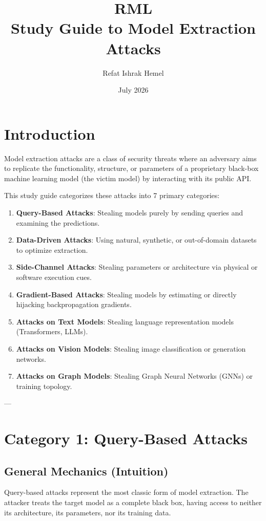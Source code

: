 \documentclass{article}
\title{RML\\
\large Study Guide to Model Extraction Attacks}
\author{Refat Ishrak Hemel}
\date{July 2026}
\begin{document}
\maketitle

\section{Introduction}
Model extraction attacks are a class of security threats where an adversary aims to replicate the functionality, structure, or parameters of a proprietary black-box machine learning model (the victim model) by interacting with its public API. 

This study guide categorizes these attacks into 7 primary categories:
\begin{enumerate}
    \item \textbf{Query-Based Attacks}: Stealing models purely by sending queries and examining the predictions.
    \item \textbf{Data-Driven Attacks}: Using natural, synthetic, or out-of-domain datasets to optimize extraction.
    \item \textbf{Side-Channel Attacks}: Stealing parameters or architecture via physical or software execution cues.
    \item \textbf{Gradient-Based Attacks}: Stealing models by estimating or directly hijacking backpropagation gradients.
    \item \textbf{Attacks on Text Models}: Stealing language representation models (Transformers, LLMs).
    \item \textbf{Attacks on Vision Models}: Stealing image classification or generation networks.
    \item \textbf{Attacks on Graph Models}: Stealing Graph Neural Networks (GNNs) or training topology.
\end{enumerate}

---

\section{Category 1: Query-Based Attacks}

\subsection{General Mechanics (Intuition)}
Query-based attacks represent the most classic form of model extraction. The attacker treats the target model as a complete black box, having access to neither its architecture, its parameters, nor its training data. 
\end{document}
